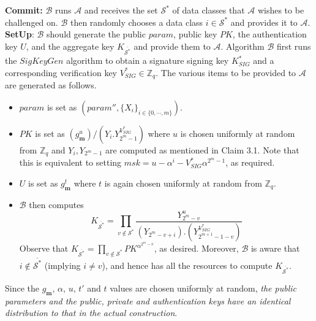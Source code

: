 \noindent \textbf{Commit:} $\mathcal{B}$ runs $\mathcal{A}$ and receives the set ${\mathcal{S}}^{*}$ of data classes that $\mathcal{A}$ wishes to be challenged on. $\mathcal{B}$ then randomly chooses a data class $i\in{\mathcal{S}}^{*}$ and provides it to $\mathcal{A}$.\\
 
\noindent \textbf{SetUp}: $\mathcal{B}$ should generate the public $param$, public key $PK$, the authentication key $U$, and the aggregate key $K_{\overline{{\mathcal{S}}^{*}}}$ and provide them to $\mathcal{A}$. Algorithm $\mathcal{B}$ first runs the $SigKeyGen$ algorithm to obtain a signature signing key $K^{*}_{SIG}$ and a corresponding verification key $V^{*}_{SIG} \in \mathbb{Z}_q$. The various items to be provided to $\mathcal{A}$ are generated as follows.
\begin{itemize}
  \item $param$ is set as $(param'',\{X_i\}_{i\in\{0,\cdots,m\}})\nonumber$.
  \item $PK$ is set as $\left({g^u_{\mathbf{m}}}\right)/{\left(Y_i.Y^{V^{*}_{SIG}}_{2^m-1}\right)}$ where $u$ is chosen uniformly at random from $\mathbb{Z}_q$ and $Y_i,Y_{2^m-1}$ are computed as mentioned in Claim 3.1. Note that this is equivalent to setting $msk=u-\alpha^i-V^{*}_{SIG}\alpha^{2^m-1}$, as required.
  \item $U$ is set as $g^{t}_{\mathbf{m}}$ where $t$ is again chosen uniformly at random from $\mathbb{Z}_q$.
  \item $\mathcal{B}$ then computes   
  \begin{equation}
   K_{\overline{{\mathcal{S}}^{*}}} = \prod_{v\notin{\mathcal{S}}^{*}}\frac{Y^{u}_{2^m-v}}{(Y_{2^m-v+i}).(Y^{V^{*}_{SIG}}_{2^{m+1}-1-v})}\nonumber
  \end{equation}
  \noindent Observe that $K_{\overline{{\mathcal{S}}^{*}}}=\prod_{v\notin{\mathcal{S}}^{*}}PK^{\alpha^{2^m-v}}$, as desired. Moreover, $\mathcal{B}$ is aware that $i\notin \overline{{\mathcal{S}}^{*}}$ (implying $i\neq v$), and hence has all the resources to compute $K_{\overline{{\mathcal{S}}^{*}}}$.  
\end{itemize}
 
\noindent Since the $g_{\mathbf{m}}$, $\alpha$, $u$, $t'$ and $t$ values are chosen uniformly at random, \emph{the public parameters and the public, private and authentication keys have an identical distribution to that in the actual construction}.\\


